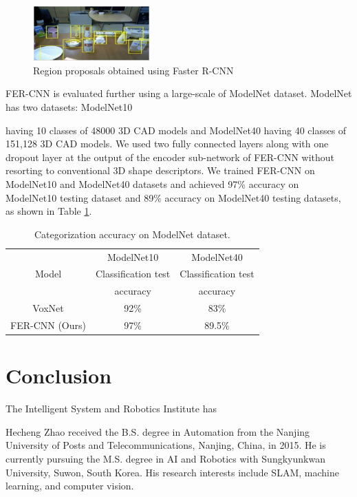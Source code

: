 \documentclass{ieeeaccess}
\begin{document}
\begin{figure}[t!]
\centering
\label{deep_result}
\includegraphics[width=0.4\textwidth]{deep_result.png}
\caption{Region proposals obtained using Faster R-CNN}
\end{figure}

FER-CNN is evaluated further using a large-scale of
ModelNet dataset. ModelNet has two datasets: ModelNet10

having 10 classes of 48000 3D CAD models and ModelNet40
having 40 classes of 151,128 3D CAD models. We used two
fully connected layers along with one dropout layer at the
output of the encoder sub-network of FER-CNN without
resorting to conventional 3D shape descriptors. We trained
FER-CNN on ModelNet10 and ModelNet40 datasets and
achieved 97\% accuracy on ModelNet10 testing dataset and
89\% accuracy on ModelNet40 testing datasets, as shown in
Table \ref{deep_table}.

\begin{table}
\label{deep_table}
\setlength{\tabcolsep}{3pt}
\centering
\begin{tabular}{|c|c|c|}
\hline
 & ModelNet10 & ModelNet40 \\
Model & Classification test & Classification test \\
& accuracy & accuracy \\
\hline
VoxNet & 92\% & 83\% \\
\hline
FER-CNN (Ours) & 97\% & 89.5\% \\
\hline
\end{tabular}
\caption{Categorization accuracy on ModelNet dataset.}
\end{table}

\section{Conclusion}
The Intelligent System and Robotics Institute has 




\begin{IEEEbiography}{Hecheng Zhao} received the B.S. degree
in Automation from
the Nanjing University of Posts and Telecommunications,
Nanjing, China, in 2015. He is currently pursuing the M.S. degree in AI and Robotics with Sungkyunkwan University,
Suwon, South Korea.
His research interests include SLAM, machine learning, and computer vision.
\end{IEEEbiography}
\end{document}
